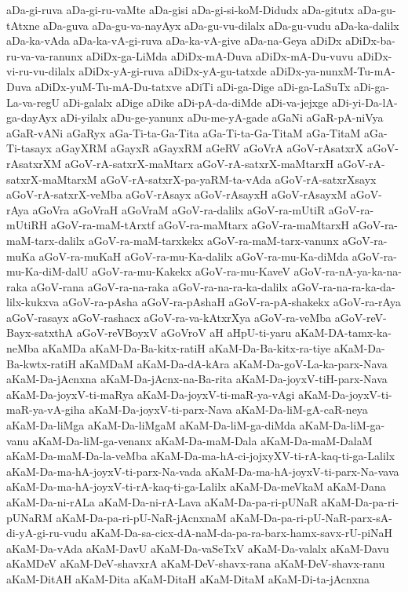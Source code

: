 {aDa-gi-ruva
aDa-gi-ru-vaMte
aDa-gisi
aDa-gi-si-koM-Didudx
aDa-gitutx
aDa-gu-tAtxne
aDa-guva
aDa-gu-va-nayAyx
aDa-gu-vu-dilalx
aDa-gu-vudu
aDa-ka-dalilx
aDa-ka-vAda
aDa-ka-vA-gi-ruva
aDa-ka-vA-give
aDa-na-Geya
aDiDx
aDiDx-ba-ru-va-va-ranunx
aDiDx-ga-LiMda
aDiDx-mA-Duva
aDiDx-mA-Du-vuvu
aDiDx-vi-ru-vu-dilalx
aDiDx-yA-gi-ruva
aDiDx-yA-gu-tatxde
aDiDx-ya-nunxM-Tu-mA-Duva
aDiDx-yuM-Tu-mA-Du-tatxve
aDiTi
aDi-ga-Dige
aDi-ga-LaSuTx
aDi-ga-La-va-regU
aDi-galalx
aDige
aDike
aDi-pA-da-diMde
aDi-va-jejxge
aDi-yi-Da-lA-ga-dayAyx
aDi-yilalx
aDu-ge-yanunx
aDu-me-yA-gade
aGaNi
aGaR-pA-niVya
aGaR-vANi
aGaRyx
aGa-Ti-ta-Ga-Tita
aGa-Ti-ta-Ga-TitaM
aGa-TitaM
aGa-Ti-tasayx
aGayXRM
aGayxR
aGayxRM
aGeRV
aGoVrA
aGoV-rAsatxrX
aGoV-rAsatxrXM
aGoV-rA-satxrX-maMtarx
aGoV-rA-satxrX-maMtarxH
aGoV-rA-satxrX-maMtarxM
aGoV-rA-satxrX-pa-yaRM-ta-vAda
aGoV-rA-satxrXsayx
aGoV-rA-satxrX-veMba
aGoV-rAsayx
aGoV-rAsayxH
aGoV-rAsayxM
aGoV-rAya
aGoVra
aGoVraH
aGoVraM
aGoV-ra-dalilx
aGoV-ra-mUtiR
aGoV-ra-mUtiRH
aGoV-ra-maM-tArxtf
aGoV-ra-maMtarx
aGoV-ra-maMtarxH
aGoV-ra-maM-tarx-dalilx
aGoV-ra-maM-tarxkekx
aGoV-ra-maM-tarx-vanunx
aGoV-ra-muKa
aGoV-ra-muKaH
aGoV-ra-mu-Ka-dalilx
aGoV-ra-mu-Ka-diMda
aGoV-ra-mu-Ka-diM-dalU
aGoV-ra-mu-Kakekx
aGoV-ra-mu-KaveV
aGoV-ra-nA-ya-ka-na-raka
aGoV-rana
aGoV-ra-na-raka
aGoV-ra-na-ra-ka-dalilx
aGoV-ra-na-ra-ka-da-lilx-kukxva
aGoV-ra-pAsha
aGoV-ra-pAshaH
aGoV-ra-pA-shakekx
aGoV-ra-rAya
aGoV-rasayx
aGoV-rashacx
aGoV-ra-va-kAtxrXya
aGoV-ra-veMba
aGoV-reV-Bayx-satxthA
aGoV-reVBoyxV
aGoVroV
aH
aHpU-ti-yaru
aKaM-DA-tamx-ka-neMba
aKaMDa
aKaM-Da-Ba-kitx-ratiH
aKaM-Da-Ba-kitx-ra-tiye
aKaM-Da-Ba-kwtx-ratiH
aKaMDaM
aKaM-Da-dA-kAra
aKaM-Da-goV-La-ka-parx-Nava
aKaM-Da-jAcnxna
aKaM-Da-jAcnx-na-Ba-rita
aKaM-Da-joyxV-tiH-parx-Nava
aKaM-Da-joyxV-ti-maRya
aKaM-Da-joyxV-ti-maR-ya-vAgi
aKaM-Da-joyxV-ti-maR-ya-vA-giha
aKaM-Da-joyxV-ti-parx-Nava
aKaM-Da-liM-gA-caR-neya
aKaM-Da-liMga
aKaM-Da-liMgaM
aKaM-Da-liM-ga-diMda
aKaM-Da-liM-ga-vanu
aKaM-Da-liM-ga-venanx
aKaM-Da-maM-Dala
aKaM-Da-maM-DalaM
aKaM-Da-maM-Da-la-veMba
aKaM-Da-ma-hA-ci-jojxyXV-ti-rA-kaq-ti-ga-Lalilx
aKaM-Da-ma-hA-joyxV-ti-parx-Na-vada
aKaM-Da-ma-hA-joyxV-ti-parx-Na-vava
aKaM-Da-ma-hA-joyxV-ti-rA-kaq-ti-ga-Lalilx
aKaM-Da-meVkaM
aKaM-Dana
aKaM-Da-ni-rALa
aKaM-Da-ni-rA-Lava
aKaM-Da-pa-ri-pUNaR
aKaM-Da-pa-ri-pUNaRM
aKaM-Da-pa-ri-pU-NaR-jAcnxnaM
aKaM-Da-pa-ri-pU-NaR-parx-sA-di-yA-gi-ru-vudu
aKaM-Da-sa-cicx-dA-naM-da-pa-ra-barx-hamx-savx-rU-piNaH
aKaM-Da-vAda
aKaM-DavU
aKaM-Da-vaSeTxV
aKaM-Da-valalx
aKaM-Davu
aKaMDeV
aKaM-DeV-shavxrA
aKaM-DeV-shavx-rana
aKaM-DeV-shavx-ranu
aKaM-DitAH
aKaM-Dita
aKaM-DitaH
aKaM-DitaM
aKaM-Di-ta-jAcnxna
}
